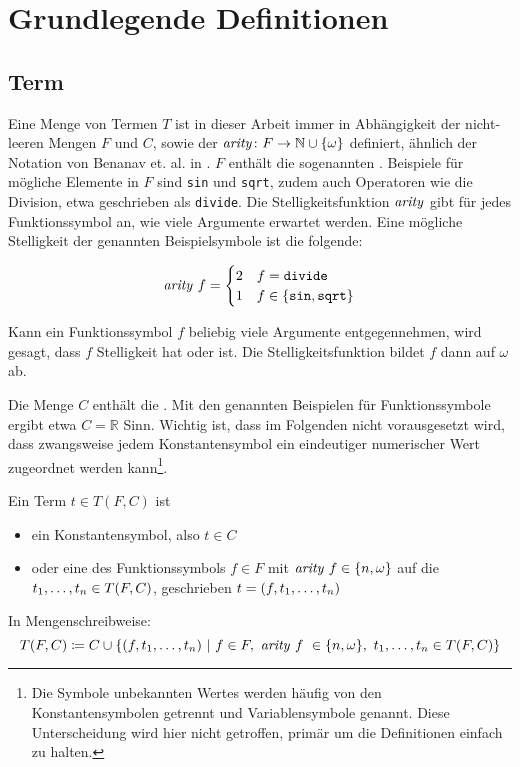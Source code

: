 


\chapter{Grundlegende Definitionen} \label{secGrundlegendeDefinitionen}

\section{Term} \label{subsecTerm}
Eine Menge von Termen $T$ ist in dieser Arbeit immer  in Abhängigkeit der nicht-leeren Mengen $F$ und $C$, sowie der  $\Const{arity} \colon F \rightarrow \mathbb{N} \cup \{\omega\}$ definiert, ähnlich der Notation von Benanav et. al. in \cite{NPHardMatching}. $F$ enthält die sogenannten . Beispiele für mögliche Elemente in $F$ sind \texttt{sin} und \texttt{sqrt}, zudem auch Operatoren wie die Division, etwa geschrieben als \texttt{divide}. Die Stelligkeitsfunktion $\Const{arity}$ gibt für jedes Funktionssymbol an, wie viele Argumente erwartet werden. Eine mögliche Stelligkeit der genannten Beispielsymbole ist die folgende:

$$\Const{arity}~f = \begin{cases}
2 & f  = \texttt{divide}\\
1 & f \in \{\texttt{sin}, \texttt{sqrt}\}\\
\end{cases}$$

Kann ein \Gls{Funktionssymbol} $f$ beliebig viele Argumente entgegennehmen, wird gesagt, dass $f$  Stelligkeit hat oder  ist. Die Stelligkeitsfunktion bildet $f$ dann auf $\omega$ ab. 

Die Menge $C$ enthält die . Mit den genannten Beispielen für Funktionssymbole ergibt etwa $C = \mathbb R$ Sinn. Wichtig ist, dass im Folgenden nicht vorausgesetzt wird, dass zwangsweise jedem \Gls{Konstantensymbol} ein eindeutiger numerischer Wert zugeordnet werden kann\footnote{Die Symbole unbekannten Wertes werden häufig von den Konstantensymbolen getrennt und Variablensymbole genannt. Diese Unterscheidung wird hier nicht getroffen, primär um die Definitionen einfach zu halten.}.




\begin{definition}\label{defTerm}
Ein \Gls{Term} $t \in T(F, C)$ ist {
\begin{itemize}
	\item{ein \Gls{Konstantensymbol}, also $t \in C$}
	\item{oder eine  des Funktionssymbols $f \in F$ mit $\Const{arity}~f \in \{n, \omega\}$ 
		auf die  ${\tOneN \in T(F, C)}$, geschrieben ${t = (f, \tOneN)}$}
\end{itemize}}
In Mengenschreibweise:
$$T(F, C) \coloneqq C \cup \curl*{
(f, \tOneN)~|
~f\in F,~\Const{arity}~f~ \in \{n, \omega\},~ \tOneN \in T(F, C)
}$$ 
\end{definition}

